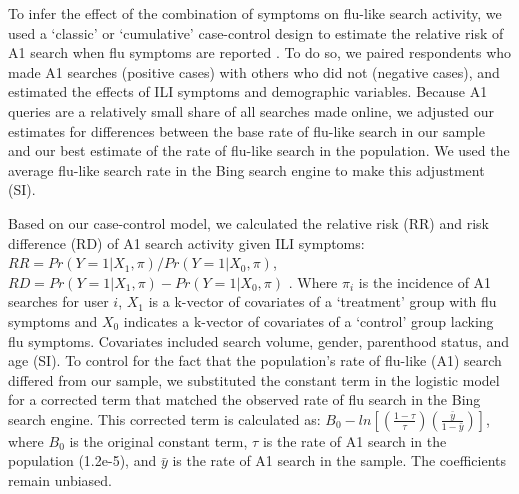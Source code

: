 \documentclass[fleqn,10pt]{wlscirep}
\begin{document}
To infer the effect of the combination of symptoms on flu-like search activity, we used a `classic' or `cumulative' case-control design to estimate the relative risk of A1 search when flu symptoms are reported \cite{king_and_zeng_2001}. To do so, we paired respondents who made A1 searches (positive cases) with others who did not (negative cases), and estimated the effects of ILI symptoms and demographic variables. Because A1 queries are a relatively small share of all searches made online, we adjusted our estimates for differences between the base rate of flu-like search in our sample and our best estimate of the rate of flu-like search in the population. We used the average flu-like search rate in the Bing search engine to make this adjustment (SI). 

Based on our case-control model, we calculated the relative risk (RR) and risk difference (RD) of A1 search activity given ILI symptoms: $ RR = Pr(Y=1|X_1, \pi) / Pr(Y=1|X_0, \pi) $, $ RD = Pr(Y=1|X_1, \pi) - Pr(Y=1|X_0, \pi) $ \cite{king_and_zeng_2001}. Where $\pi_i$ is the incidence of A1 searches for user $i$, $X_1$ is a k-vector of covariates of a `treatment' group with flu symptoms and $X_0$ indicates a k-vector of covariates of a `control' group lacking flu symptoms. Covariates included search volume, gender, parenthood status, and age (SI). To control for the fact that the population's rate of flu-like (A1) search differed from our sample, we substituted the constant term in the logistic model for a corrected term that matched the observed rate of flu search in the Bing search engine. This corrected term is calculated as: $B_0 - ln[ (\frac{1-\tau}{\tau}) (\frac{\bar{y}}{1-\bar{y}}) ]$, where $B_0$ is the original constant term, $\tau$ is the rate of A1 search in the population (1.2e-5), and $\bar{y}$ is the rate of A1 search in the sample. The coefficients remain unbiased. 


\end{document}
